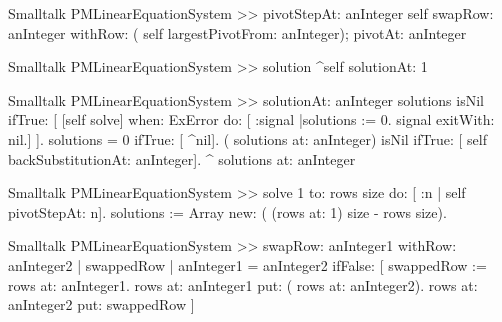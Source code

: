 \begin{displaycode}{Smalltalk}
PMLinearEquationSystem >> pivotStepAt: anInteger
    self swapRow: anInteger withRow: ( self largestPivotFrom: 
                                                           anInteger);
           pivotAt: anInteger
\end{displaycode}


\begin{displaycode}{Smalltalk}
PMLinearEquationSystem >> solution
    ^self solutionAt: 1
\end{displaycode}

\begin{displaycode}{Smalltalk}
PMLinearEquationSystem >> solutionAt: anInteger
    solutions isNil
        ifTrue: [ [self solve] when: ExError do: [ :signal |solutions 
                                       := 0. signal exitWith: nil.] ].
    solutions = 0
        ifTrue: [ ^nil].
    ( solutions at: anInteger) isNil
        ifTrue: [ self backSubstitutionAt: anInteger].
    ^ solutions at: anInteger
\end{displaycode}

\begin{displaycode}{Smalltalk}
PMLinearEquationSystem >> solve
    1 to: rows size do: [ :n | self pivotStepAt: n].
    solutions := Array new: ( (rows at: 1) size - rows size).
\end{displaycode}

\begin{displaycode}{Smalltalk}
PMLinearEquationSystem >> swapRow: anInteger1 withRow: anInteger2
    | swappedRow |
    anInteger1 = anInteger2
        ifFalse: [ swappedRow := rows at: anInteger1.
                      rows at: anInteger1 put: ( rows at: 
                                                          anInteger2).
                      rows at: anInteger2 put: swappedRow ]
\end{displaycode}

